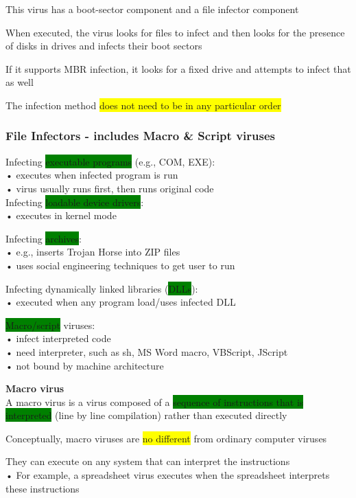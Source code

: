 \documentclass[]{project_plan}
\begin{document}
This virus has a boot-sector component and a file infector component

When executed, the virus looks for files to infect and then looks for the presence of
disks in drives and infects their boot sectors

If it supports MBR infection, it looks for a fixed drive and attempts to infect that as well

The infection method \colorbox{yellow}{does not need to be in any particular order}

\subsubsection{File Infectors - includes Macro \& Script viruses}

Infecting \colorbox{green}{executable programs} (e.g., COM, EXE):\\
• executes when infected program is run\\
• virus usually runs first, then runs original code\\

Infecting \colorbox{green}{loadable device drivers}:\\
• executes in kernel mode

Infecting \colorbox{green}{archives}:\\
• e.g., inserts Trojan Horse into ZIP files\\
• uses social engineering techniques to get user to run

Infecting dynamically linked libraries (\colorbox{green}{DLLs}):\\
• executed when any program load/uses infected DLL

\colorbox{green}{Macro/script} viruses:\\
• infect interpreted code\\
• need interpreter, such as sh, MS Word macro, VBScript, JScript\\
• not bound by machine architecture

\textbf{Macro virus}\\
A macro virus is a virus composed of a \colorbox{green}{sequence of instructions that is interpreted} (line by line compilation)
rather than executed directly

Conceptually, macro viruses are \colorbox{yellow}{no different} from ordinary computer viruses

\newpage

They can execute on any system that can interpret the instructions\\
• For example, a spreadsheet virus executes when the spreadsheet interprets these
instructions
\end{document}
